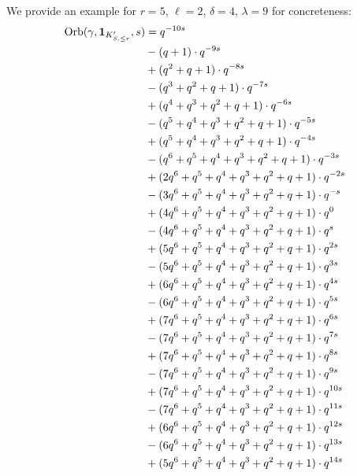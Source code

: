 \begin{example}
  We provide an example for $r=5$, $\ell=2$, $\delta=4$, $\lambda=9$ for concreteness:
  \begin{align*}
    \Orb(\gamma, \mathbf{1}_{K'_{S, \le r}}, s)
    &= q^{-10s} \\
    &- (q + 1) \cdot q^{-9s} \\
    &+ (q^2 + q + 1) \cdot q^{-8s} \\
    &- (q^3 + q^2 + q + 1) \cdot q^{-7s} \\
    &+ (q^4 + q^3 + q^2 + q + 1) \cdot q^{-6s} \\
    &- (q^5 + q^4 + q^3 + q^2 + q + 1) \cdot q^{-5s} \\
    &+ (q^5 + q^4 + q^3 + q^2 + q + 1) \cdot q^{-4s} \\
    &- (q^6 + q^5 + q^4 + q^3 + q^2 + q + 1) \cdot q^{-3s} \\
    &+ (2q^6 + q^5 + q^4 + q^3 + q^2 + q + 1) \cdot q^{-2s} \\
    &- (3q^6 + q^5 + q^4 + q^3 + q^2 + q + 1) \cdot q^{-s} \\
    &+ (4q^6 + q^5 + q^4 + q^3 + q^2 + q + 1) \cdot q^{0} \\
    &- (4q^6 + q^5 + q^4 + q^3 + q^2 + q + 1) \cdot q^{s} \\
    &+ (5q^6 + q^5 + q^4 + q^3 + q^2 + q + 1) \cdot q^{2s} \\
    &- (5q^6 + q^5 + q^4 + q^3 + q^2 + q + 1) \cdot q^{3s} \\
    &+ (6q^6 + q^5 + q^4 + q^3 + q^2 + q + 1) \cdot q^{4s} \\
    &- (6q^6 + q^5 + q^4 + q^3 + q^2 + q + 1) \cdot q^{5s} \\
    &+ (7q^6 + q^5 + q^4 + q^3 + q^2 + q + 1) \cdot q^{6s} \\
    &- (7q^6 + q^5 + q^4 + q^3 + q^2 + q + 1) \cdot q^{7s} \\
    &+ (7q^6 + q^5 + q^4 + q^3 + q^2 + q + 1) \cdot q^{8s} \\
    &- (7q^6 + q^5 + q^4 + q^3 + q^2 + q + 1) \cdot q^{9s} \\
    &+ (7q^6 + q^5 + q^4 + q^3 + q^2 + q + 1) \cdot q^{10s} \\
    &- (7q^6 + q^5 + q^4 + q^3 + q^2 + q + 1) \cdot q^{11s} \\
    &+ (6q^6 + q^5 + q^4 + q^3 + q^2 + q + 1) \cdot q^{12s} \\
    &- (6q^6 + q^5 + q^4 + q^3 + q^2 + q + 1) \cdot q^{13s} \\
    &+ (5q^6 + q^5 + q^4 + q^3 + q^2 + q + 1) \cdot q^{14s} \\

\end{align*}
\end{example}
